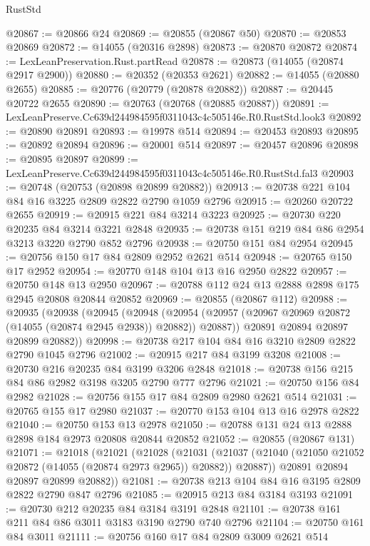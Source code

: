 \begin{lexlean}{RustStd}
\begin{coremodule}
@20867 := @20866 @24
@20869 := @20855 (@20867 @50)
@20870 := @20853 @20869
@20872 := @14055 (@20316 @2898)
@20873 := @20870 @20872
@20874 := LexLeanPreservation.Rust.partRead
@20878 := @20873 (@14055 (@20874 @2917 @2900))
@20880 := @20352 (@20353 @2621)
@20882 := @14055 (@20880 @2655)
@20885 := @20776 (@20779 (@20878 @20882))
@20887 := @20445 @20722 @2655
@20890 := @20763 (@20768 (@20885 @20887))
@20891 := LexLeanPreserve.Cc639d244984595f0311043c4c505146e.R0.RustStd.look3
@20892 := @20890 @20891
@20893 := @19978 @514
@20894 := @20453 @20893
@20895 := @20892 @20894
@20896 := @20001 @514
@20897 := @20457 @20896
@20898 := @20895 @20897
@20899 := LexLeanPreserve.Cc639d244984595f0311043c4c505146e.R0.RustStd.fal3
@20903 := @20748 (@20753 (@20898 @20899 @20882))
@20913 := @20738 @221 @104 @84 @16 @3225 @2809 @2822 @2790 @1059 @2796
@20915 := @20260 @20722 @2655
@20919 := @20915 @221 @84 @3214 @3223
@20925 := @20730 @220 @20235 @84 @3214 @3221 @2848
@20935 := @20738 @151 @219 @84 @86 @2954 @3213 @3220 @2790 @852 @2796
@20938 := @20750 @151 @84 @2954
@20945 := @20756 @150 @17 @84 @2809 @2952 @2621 @514
@20948 := @20765 @150 @17 @2952
@20954 := @20770 @148 @104 @13 @16 @2950 @2822
@20957 := @20750 @148 @13 @2950
@20967 := @20788 @112 @24 @13 @2888 @2898 @175 @2945 @20808 @20844 @20852
@20969 := @20855 (@20867 @112)
@20988 := @20935
    (@20938
      (@20945
        (@20948
          (@20954 (@20957 (@20967 @20969 @20872 (@14055 (@20874 @2945 @2938)) @20882)) @20887))
        @20891
        @20894
        @20897
        @20899
        @20882))
@20998 := @20738 @217 @104 @84 @16 @3210 @2809 @2822 @2790 @1045 @2796
@21002 := @20915 @217 @84 @3199 @3208
@21008 := @20730 @216 @20235 @84 @3199 @3206 @2848
@21018 := @20738 @156 @215 @84 @86 @2982 @3198 @3205 @2790 @777 @2796
@21021 := @20750 @156 @84 @2982
@21028 := @20756 @155 @17 @84 @2809 @2980 @2621 @514
@21031 := @20765 @155 @17 @2980
@21037 := @20770 @153 @104 @13 @16 @2978 @2822
@21040 := @20750 @153 @13 @2978
@21050 := @20788 @131 @24 @13 @2888 @2898 @184 @2973 @20808 @20844 @20852
@21052 := @20855 (@20867 @131)
@21071 := @21018
    (@21021
      (@21028
        (@21031
          (@21037 (@21040 (@21050 @21052 @20872 (@14055 (@20874 @2973 @2965)) @20882)) @20887))
        @20891
        @20894
        @20897
        @20899
        @20882))
@21081 := @20738 @213 @104 @84 @16 @3195 @2809 @2822 @2790 @847 @2796
@21085 := @20915 @213 @84 @3184 @3193
@21091 := @20730 @212 @20235 @84 @3184 @3191 @2848
@21101 := @20738 @161 @211 @84 @86 @3011 @3183 @3190 @2790 @740 @2796
@21104 := @20750 @161 @84 @3011
@21111 := @20756 @160 @17 @84 @2809 @3009 @2621 @514

\end{coremodule}
\end{lexlean}
